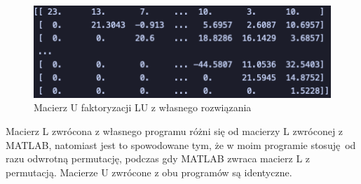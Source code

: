 \documentclass{article}
\begin{document}
\begin{figure}[H]
  \centering
  \includegraphics[width=\linewidth]{u_python2.png}
  \caption{Macierz U faktoryzacji LU z własnego rozwiązania}
  \label{fig:u_python2}
\end{figure}

Macierz L zwrócona z własnego programu różni się od macierzy L zwróconej z MATLAB, natomiast jest to spowodowane tym, że w moim programie stosuję od razu odwrotną permutację, podczas gdy MATLAB zwraca macierz L z permutacją. Macierze U zwrócone z obu programów są identyczne.
\end{document}
